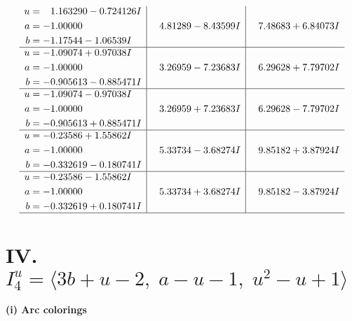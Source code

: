 \documentclass[1p]{elsarticle_modified}
\theoremstyle{definition}
\begin{document}
$$\begin{array}{c|c|c}
\begin{aligned}
u &= \phantom{-}1.163290 - 0.724126 I \\
a &= -1.00000\phantom{ +0.000000I} \\
b &= -1.17544 - 1.06539 I\end{aligned}
 & \phantom{-}4.81289 - 8.43599 I & \phantom{-}7.48683 + 6.84073 I \\ \hline\begin{aligned}
u &= -1.09074 + 0.97038 I \\
a &= -1.00000\phantom{ +0.000000I} \\
b &= -0.905613 - 0.885471 I\end{aligned}
 & \phantom{-}3.26959 - 7.23683 I & \phantom{-}6.29628 + 7.79702 I \\ \hline\begin{aligned}
u &= -1.09074 - 0.97038 I \\
a &= -1.00000\phantom{ +0.000000I} \\
b &= -0.905613 + 0.885471 I\end{aligned}
 & \phantom{-}3.26959 + 7.23683 I & \phantom{-}6.29628 - 7.79702 I \\ \hline\begin{aligned}
u &= -0.23586 + 1.55862 I \\
a &= -1.00000\phantom{ +0.000000I} \\
b &= -0.332619 - 0.180741 I\end{aligned}
 & \phantom{-}5.33734 - 3.68274 I & \phantom{-}9.85182 + 3.87924 I \\ \hline\begin{aligned}
u &= -0.23586 - 1.55862 I \\
a &= -1.00000\phantom{ +0.000000I} \\
b &= -0.332619 + 0.180741 I\end{aligned}
 & \phantom{-}5.33734 + 3.68274 I & \phantom{-}9.85182 - 3.87924 I\\
 \hline 
 \end{array}$$\newpage\newpage\renewcommand{\arraystretch}{1}
\centering \section*{IV. $I^u_{4}= \langle 3 b+u-2,\;a- u-1,\;u^2- u+1 \rangle$}
\flushleft \textbf{(i) Arc colorings}\\
\end{document}
